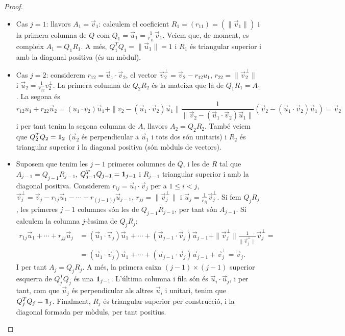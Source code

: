 \documentclass[
  11pt,
]{book}
\numberwithin{dummy}{section}
\theoremstyle{maincolornumbox}
\theoremstyle{blacknumex}
\theoremstyle{blacknumbox}
\theoremstyle{maincolornum}
\begin{document}
\begin{proof}
\begin{itemize}
\item
  Cas \(j=1\): llavors \(A_1=\vec v_1\): calculem el coeficient
  \(R_1=(r_{11})=(\|\vec v_1\|)\) i la primera columna de \(Q\) com
  \(Q_1=\vec u_1=\frac{1}{r_{11}}\vec v_1\). Veiem que, de moment, es
  compleix \(A_1=Q_1R_1\). A més, \(Q_1^TQ_1=\|\vec u_1\|=1\) i \(R_1\) és
  triangular superior i amb la diagonal positiva (és un mòdul).
\item
  Cas \(j=2\): considerem \(r_{12}=\vec u_1\cdot \vec v_2\), el vector
  \(\vec v_2^\perp=\vec v_2-r_{12}u_1\), \(r_{22}=\|\vec v_2^\perp\|\) i
  \(\vec u_2=\frac{1}{r_{22}} v_2^\perp\). La primera columna de
  \(Q_2R_2\) és la mateixa que la de \(Q_1R_1=A_1\). La segona és
  \[r_{12}u_1+r_{22}\vec u_2=(u_1\cdot v_2)\vec u_1+\|v_2-(\vec u_1\cdot \vec v_2)\vec u_1\|\frac{1}{\|\vec v_2-(\vec u_1\cdot \vec v_2)\vec u_1\|}(\vec v_2-(\vec u_1\cdot \vec v_2)\vec u_1)=\vec v_2\]
  i per tant tenim la segona columna de \(A\), llavors \(A_2=Q_2R_2\).
  També veiem que \(Q_2^TQ_2=\mathbf{1}_2\) (\(\vec u_2\) és perpendicular a
  \(\vec u_1\) i tots dos són unitaris) i \(R_2\) és triangular superior i
  la diagonal positiva (són mòduls de vectors).
\item
  Suposem que tenim les \(j-1\) primeres columnes de \(Q\), i les de \(R\)
  tal que \(A_{j-1}=Q_{j-1}R_{j-1}\), \(Q_{j-1}^TQ_{j-1}=\mathbf{1}_{j-1}\) i
  \(R_{j-1}\) triangular superior i amb la diagonal positiva. Considerem
  \(r_{ij}=\vec u_i\cdot \vec v_j\) per a \(1\leq i <j\),
  \(\vec v_j^\perp=\vec v_j-r_{1j}\vec u_1-\cdots-r_{(j-1)j}\vec u_{j-1}\),
  \(r_{jj}=\|\vec v_j^\perp\|\) i
  \(\vec u_j=\frac{1}{r_{jj}} \vec v_j^\perp\). Si fem \(Q_jR_j\), les
  primeres \(j-1\) columnes són les de \(Q_{j-1}R_{j-1}\), per tant són
  \(A_{j-1}\). Si calculem la columna \(j\)-èssima de \(Q_jR_j\):
  \begin{align*}
       r_{1j}\vec u_1+\cdots+r_{jj}\vec u_j & =(\vec u_1\cdot \vec v_j)\vec u_1+\cdots+(\vec u_{j-1}\cdot \vec v_j)\vec u_{j-1}+\|\vec v_j^\perp\|\frac{1}{\|\vec v_j^\perp\|} \vec v_j^\perp = \\
       & =(\vec u_1\cdot \vec v_j)\vec u_1+\cdots+(\vec u_{j-1}\cdot \vec v_j)\vec u_{j-1}+ \vec v_j^\perp=\vec v_j .
  \end{align*} I per tant \(A_j=Q_jR_j\). A més, la primera caixa
  \((j-1)\times(j-1)\) superior esquerra de \(Q_j^TQ_j\) és una
  \(\mathbf{1}_{j-1}\). L'última columna i fila són és \(\vec u_i\cdot \vec u_j\),
  i per tant, com que \(\vec u_j\) és perpendicular als altres
  \(\vec u_i\) i unitari, tenim que \(Q_j^TQ_j=\mathbf{1}_j\). Finalment, \(R_j\) és
  triangular superior per construcció, i la diagonal formada per
  mòduls, per tant positius.
\end{itemize}


\end{proof}
\end{document}
